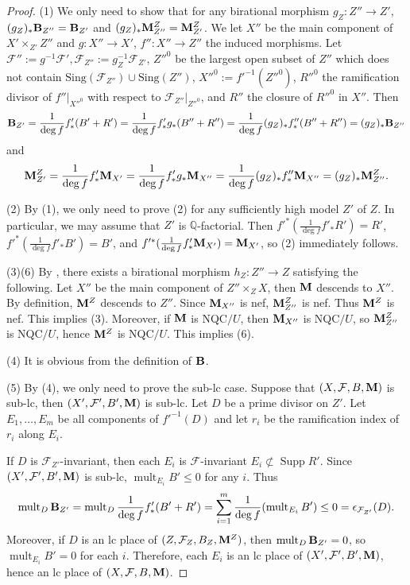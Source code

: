 \documentclass[11pt]{amsart}
\numberwithin{equation}{section}
\newcommand{\Mm}{{\bf{M}}}
\newcommand{\Qq}{\mathbb{Q}}
\newcommand{\Supp}{\operatorname{Supp}}
\newcommand{\mult}{\operatorname{mult}}
\newcommand{\Bb}{{\bf{B}}}
\newcommand{\Ff}{\mathcal{F}}
\newcommand{\Sing}{\mathrm{Sing}}
\theoremstyle{definition}
\theoremstyle{definition}
\theoremstyle{definition}
\begin{document}
\begin{proof}
(1) We only need to show that for any birational morphism $g_Z: Z''\rightarrow Z'$, $(g_Z)_*\Bb_{Z''}=\Bb_{Z'}$ and $(g_Z)_*\Mm^Z_{Z''}=\Mm^Z_{Z'}$. We let $X''$ be the main component of $X'\times_{Z'}Z''$ and $g: X''\rightarrow X'$, $f'': X''\rightarrow Z''$ the induced morphisms. Let $\Ff'':=g^{-1}\Ff',\Ff_{Z''}:=g^{-1}_Z\Ff_{Z'}$, $Z''^0$ be the largest open subset of $Z''$ which does not contain $\Sing(\Ff_{Z''})\cup\Sing(Z'')$, $X''^0:=f'^{-1}(Z''^0)$, $R''^0$ the ramification divisor of $f''|_{X''^0}$ with respect to $\Ff_{Z''}|_{Z''^0}$, and $R''$ the closure of $R''^0$ in $X''$. Then
$$\Bb_{Z'}=\frac{1}{\deg f}f'_*(B'+R')=\frac{1}{\deg f}f'_*g_*(B''+R'')=\frac{1}{\deg f}(g_Z)_*f''_*(B''+R'')=(g_Z)_*\Bb_{Z''}$$
and
$$\Mm^Z_{Z'}=\frac{1}{\deg f}f'_*\Mm_{X'}=\frac{1}{\deg f}f'_*g_*\Mm_{X''}=\frac{1}{\deg f}(g_Z)_*f''_*\Mm_{X''}=(g_Z)_*\Mm^Z_{Z''}.$$

(2) By (1), we only need to prove (2) for any sufficiently high model $Z'$ of $Z$. In particular, we may assume that $Z'$ is $\Qq$-factorial. Then $f'^*(\frac{1}{\deg f}f'_*R')=R'$, $f'^*(\frac{1}{\deg f}f'_*B')=B'$, and $f'^*(\frac{1}{\deg f}f'_*\Mm_{X'})=\Mm_{X'}$, so (2) immediately follows.

(3)(6) By \cite[Lemma 4.2]{HL21b}, there exists a birational morphism $h_Z: Z''\rightarrow Z$ satisfying the following. Let $X''$ be the main component of $Z''\times_ZX$, then $\Mm$ descends to $X''$. By definition, $\Mm^Z$ descends to $Z''$. Since $\Mm_{X''}$ is nef, $\Mm^Z_{Z''}$ is nef. Thus $\Mm^Z$ is nef. This implies (3). Moreover, if $\Mm$ is NQC$/U$, then $\Mm_{X''}$ is NQC$/U$, so  $\Mm^Z_{Z''}$ is NQC$/U$, hence $\Mm^Z$ is NQC$/U$. This implies (6).

(4) It is obvious from the definition of $\Bb$.

(5) By (4), we only need to prove the sub-lc case. Suppose that $(X,\Ff,B,\Mm)$ is sub-lc, then $(X',\Ff',B',\Mm)$ is sub-lc. Let $D$ be a prime divisor on $Z'$. Let $E_1,\dots,E_m$ be all components of $f'^{-1}(D)$ and let $r_i$ be the ramification index of $r_i$ along $E_i$. 

If $D$ is $\Ff_{Z'}$-invariant, then each $E_i$ is $\Ff$-invariant $E_i\not\subset\Supp R'$. Since $(X',\Ff',B',\Mm)$ is sub-lc, $\mult_{E_i}B'\leq 0$ for any $i$. Thus
$$\mult_D\Bb_{Z'}=\mult_D\frac{1}{\deg f}f'_*(B'+R')=\sum_{i=1}^m\frac{1}{\deg f}(\mult_{E_i}B')\leq 0=\epsilon_{\Ff_{Z'}}(D).$$
Moreover, if $D$ is an lc place of $(Z,\Ff_Z,B_Z,\Mm^Z)$, then $\mult_D\Bb_{Z'}=0$, so $\mult_{E_i}B'=0$ for each $i$. Therefore, each $E_i$ is an lc place of $(X',\Ff',B',\Mm)$, hence an lc place of $(X,\Ff,B,\Mm)$.


\end{proof}
\end{document}
